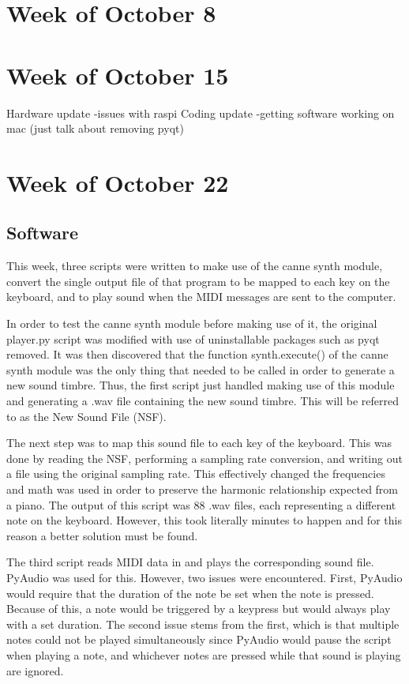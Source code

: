 \documentclass{article}
\begin{document}
\section{Week of October 8}



\section{Week of October 15}
Hardware update
-issues with raspi
Coding update
-getting software working on mac (just talk about removing pyqt)



\section{Week of October 22}

\subsection{Software}

This week, three scripts were written to make use of the canne synth module, convert the single output file of that program to be mapped to each key on the keyboard, and to play sound when the MIDI messages are sent to the computer. 

In order to test the canne synth module before making use of it, the original player.py script was modified with use of uninstallable packages such as pyqt removed. It was then discovered that the function synth.execute() of the canne synth module was the only thing that needed to be called in order to generate a new sound timbre. Thus, the first script just handled making use of this module and generating a .wav file containing the new sound timbre. This will be referred to as the New Sound File (NSF).

The next step was to map this sound file to each key of the keyboard. This was done by reading the NSF, performing a sampling rate conversion, and writing out a file using the original sampling rate. This effectively changed the frequencies and math was used in order to preserve the harmonic relationship expected from a piano. The output of this script was 88 .wav files, each representing a different note on the keyboard. However, this took literally minutes to happen and for this reason a better solution must be found.

The third script reads MIDI data in and plays the corresponding sound file. PyAudio was used for this. However, two issues were encountered. First, PyAudio would require that the duration of the note be set when the note is pressed. Because of this, a note would be triggered by a keypress but would always play with a set duration. The second issue stems from the first, which is that multiple notes could not be played simultaneously since PyAudio would pause the script when playing a note, and whichever notes are pressed while that sound is playing are ignored.
\end{document}
